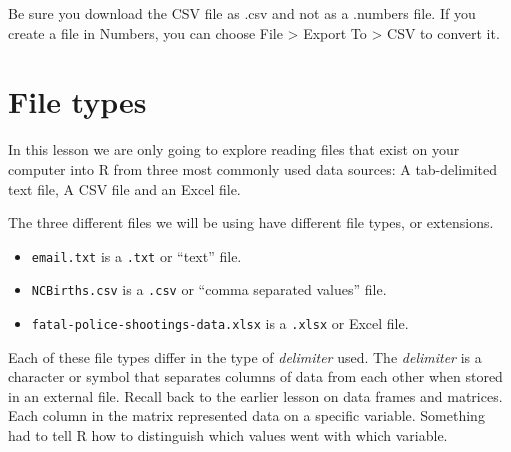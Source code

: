 \documentclass[
  letterpaper,
  DIV=11,
  numbers=noendperiod,
  oneside]{scrreprt}
\providecommand{\tightlist}{%
  \setlength{\itemsep}{0pt}\setlength{\parskip}{0pt}}\usepackage{longtable,booktabs,array}
\begin{document}
\begin{tcolorbox}[enhanced jigsaw, bottomrule=.15mm, colback=white, colframe=quarto-callout-important-color-frame, toprule=.15mm, coltitle=black, rightrule=.15mm, opacitybacktitle=0.6, colbacktitle=quarto-callout-important-color!10!white, toptitle=1mm, leftrule=.75mm, breakable, bottomtitle=1mm, titlerule=0mm, title=\textcolor{quarto-callout-important-color}{\faExclamation}\hspace{0.5em}{CAUTION FOR MAC USERS}, arc=.35mm, left=2mm, opacityback=0]

Be sure you download the CSV file as .csv and not as a .numbers file. If
you create a file in Numbers, you can choose File \textgreater{} Export
To \textgreater{} CSV to convert it.

\end{tcolorbox}

\section{File types}\label{file-types}

In this lesson we are only going to explore reading files that exist on
your computer into R from three most commonly used data sources: A
tab-delimited text file, A CSV file and an Excel file.

The three different files we will be using have different file types, or
extensions. {}

\begin{itemize}
\tightlist
\item
  \texttt{email.txt} is a \texttt{.txt} or ``text'' file.
\item
  \texttt{NCBirths.csv} is a \texttt{.csv} or ``comma separated values''
  file.
\item
  \texttt{fatal-police-shootings-data.xlsx} is a \texttt{.xlsx} or Excel
  file.
\end{itemize}

Each of these file types differ in the type of \emph{delimiter} used.
The \emph{delimiter} is a character or symbol that separates columns of
data from each other when stored in an external file. Recall back to the
earlier lesson on data frames and matrices. Each column in the matrix
represented data on a specific variable. Something had to tell R how to
distinguish which values went with which variable.
\end{document}
